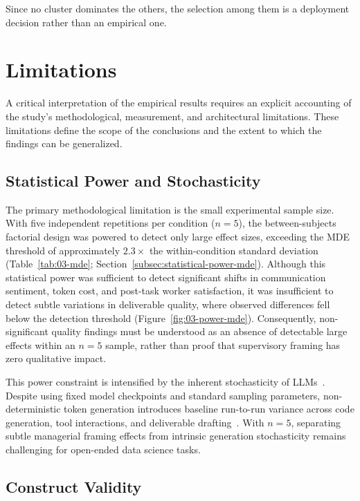 Since no cluster dominates the others, the selection among them is a deployment decision rather than an empirical one.

\section{Limitations}
\label{sec:limitations}

A critical interpretation of the empirical results requires an explicit accounting of the study's methodological, measurement, and architectural limitations.
These limitations define the scope of the conclusions and the extent to which the findings can be generalized.

\subsection{Statistical Power and Stochasticity}

The primary methodological limitation is the small experimental sample size.
With five independent repetitions per condition ($n=5$), the between-subjects factorial design was powered to detect only large effect sizes, exceeding the \ac{MDE} threshold of approximately $2.3\times$ the within-condition standard deviation (Table~\ref{tab:03-mde}; Section~\ref{subsec:statistical-power-mde}).
Although this statistical power was sufficient to detect significant shifts in communication sentiment, token cost, and post-task worker satisfaction, it was insufficient to detect subtle variations in deliverable quality, where observed differences fell below the detection threshold (Figure~\ref{fig:03-power-mde}).
Consequently, non-significant quality findings must be understood as an absence of detectable large effects within an $n=5$ sample, rather than proof that supervisory framing has zero qualitative impact.

This power constraint is intensified by the inherent stochasticity of \acp{LLM}~\cite{yehudai2026surveyevaluationllmbasedagents}.
Despite using fixed model checkpoints and standard sampling parameters, non-deterministic token generation introduces baseline run-to-run variance across code generation, tool interactions, and deliverable drafting~\cite{dominguezolmedo2024questioningsurveyresponseslarge, samuel2025personagymevaluatingpersonaagents}.
With $n=5$, separating subtle managerial framing effects from intrinsic generation stochasticity remains challenging for open-ended data science tasks.

\subsection{Construct Validity}

